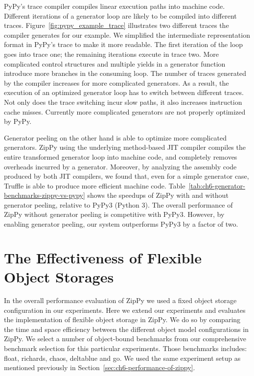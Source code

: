 PyPy's trace compiler compiles linear execution paths into machine code.
Different iterations of a generator loop are likely to be compiled into different traces.
Figure~\ref{fig:pypy_example_trace} illustrates two different traces the compiler generates for our example.
We simplified the intermediate representation format in PyPy's trace to make it more readable.
The first iteration of the loop goes into trace one; the remaining iterations execute in trace two.
More complicated control structures and multiple yields in a generator function introduce more branches in the consuming loop.
The number of traces generated by the compiler increases for more complicated generators.
As a result, the execution of an optimized generator loop has to switch between different traces.
Not only does the trace switching incur slow paths, it also increases instruction cache misses.
Currently more complicated generators are not properly optimized by PyPy.

Generator peeling on the other hand is able to optimize more complicated generators.
ZipPy using the underlying method-based JIT compiler compiles the entire transformed generator loop into machine code, and completely removes overheads incurred by a generator.
Moreover, by analyzing the assembly code produced by both JIT compilers, we found that, even for a simple generator case, Truffle is able to produce more efficient machine code.
Table~\ref{tab:ch6-generator-benchmarks-zippy-vs-pypy} shows the speedups of ZipPy with and without generator peeling, relative to PyPy3 (Python 3).
The overall performance of ZipPy without generator peeling is competitive with PyPy3.
However, by enabling generator peeling, our system outperforms PyPy3 by a factor of two.

\section{The Effectiveness of Flexible Object Storages}

In the overall performance evaluation of ZipPy we used a fixed object storage configuration in our experiments.
Here we extend our experiments and evaluates the implementation of flexible object storage in ZipPy.
We do so by comparing the time and space efficiency between the different object model configurations in ZipPy.
We select a number of object-bound benchmarks from our comprehensive benchmark selection for this particular experiments.
Those benchmarks includes: \textsf{float}, \textsf{richards}, \textsf{chaos}, \textsf{deltablue} and \textsf{go}.
We used the same experiment setup as mentioned previously in Section~\ref{sec:ch6-performance-of-zippy}.

